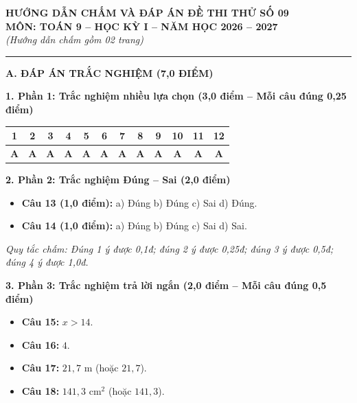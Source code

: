 \documentclass[11pt,a4paper]{article}
\begin{document}
\begin{center}
\textbf{\large HƯỚNG DẪN CHẤM VÀ ĐÁP ÁN ĐỀ THI THỬ SỐ 09}\\
\textbf{MÔN: TOÁN 9 -- HỌC KỲ I -- NĂM HỌC 2026 -- 2027}\\
\textit{(Hướng dẫn chấm gồm 02 trang)}
\end{center}

\vspace{1mm}
\noindent
\rule{\linewidth}{0.8pt}

\vspace{2mm}
\noindent
\textbf{\large A. ĐÁP ÁN TRẮC NGHIỆM (7,0 ĐIỂM)}

\vspace{2mm}
\noindent
\textbf{1. Phần 1: Trắc nghiệm nhiều lựa chọn (3,0 điểm -- Mỗi câu đúng 0,25 điểm)}
\begin{center}
\begin{tabular}{|c|c|c|c|c|c|c|c|c|c|c|c|}
\hline
\textbf{1} & \textbf{2} & \textbf{3} & \textbf{4} & \textbf{5} & \textbf{6} & \textbf{7} & \textbf{8} & \textbf{9} & \textbf{10} & \textbf{11} & \textbf{12} \\
\hline
\textbf{A} & \textbf{A} & \textbf{A} & \textbf{A} & \textbf{A} & \textbf{A} & \textbf{A} & \textbf{A} & \textbf{A} & \textbf{A} & \textbf{A} & \textbf{A} \\
\hline
\end{tabular}
\end{center}

\vspace{2mm}
\noindent
\textbf{2. Phần 2: Trắc nghiệm Đúng -- Sai (2,0 điểm)}
\begin{itemize}
  \item \textbf{Câu 13 (1,0 điểm):} a) Đúng \quad b) Đúng \quad c) Sai \quad d) Đúng.
  \item \textbf{Câu 14 (1,0 điểm):} a) Đúng \quad b) Đúng \quad c) Sai \quad d) Sai.
\end{itemize}
\textit{Quy tắc chấm: Đúng 1 ý được 0,1đ; đúng 2 ý được 0,25đ; đúng 3 ý được 0,5đ; đúng 4 ý được 1,0đ.}

\vspace{2mm}
\noindent
\textbf{3. Phần 3: Trắc nghiệm trả lời ngắn (2,0 điểm -- Mỗi câu đúng 0,5 điểm)}
\begin{itemize}
  \item \textbf{Câu 15:} $x > 14$.
  \item \textbf{Câu 16:} $4$.
  \item \textbf{Câu 17:} $21{,}7\text{ m}$ (hoặc $21{,}7$).
  \item \textbf{Câu 18:} $141{,}3\text{ cm}^2$ (hoặc $141{,}3$).
\end{itemize}
\end{document}
